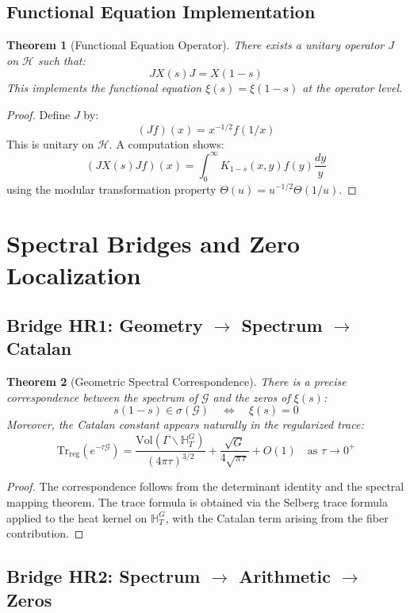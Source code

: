 \documentclass[11pt]{article}
\theoremstyle{plain}
\newtheorem{theorem}{Theorem}[section]
\theoremstyle{remark}
\newcommand{\H}{\mathbb{H}}
\newcommand{\Vol}{\mathrm{Vol}}
\newcommand{\Tr}{\mathrm{Tr}}
\newcommand{\spec}{\sigma}
\newcommand{\cH}{\mathcal{H}}
\newcommand{\cG}{\mathcal{G}}
\newcommand{\Catalan}{G}
\begin{document}
\subsection{Functional Equation Implementation}

\begin{theorem}[Functional Equation Operator]
There exists a unitary operator $J$ on $\cH$ such that:
\[
J X(s) J = X(1-s)
\]
This implements the functional equation $\xi(s) = \xi(1-s)$ at the operator level.
\end{theorem}

\begin{proof}
Define $J$ by:
\[
(Jf)(x) = x^{-1/2} f(1/x)
\]
This is unitary on $\cH$. A computation shows:
\[
(J X(s) J f)(x) = \int_0^\infty K_{1-s}(x,y) f(y) \frac{dy}{y}
\]
using the modular transformation property $\Theta(u) = u^{-1/2} \Theta(1/u)$.
\end{proof}

\section{Spectral Bridges and Zero Localization}

\subsection{Bridge HR1: Geometry $\rightarrow$ Spectrum $\rightarrow$ Catalan}

\begin{theorem}[Geometric Spectral Correspondence]
There is a precise correspondence between the spectrum of $\cG$ and the zeros of $\xi(s)$:
\[
s(1-s) \in \spec(\cG) \quad \Longleftrightarrow \quad \xi(s) = 0
\]
Moreover, the Catalan constant appears naturally in the regularized trace:
\[
\Tr_{\text{reg}}(e^{-\tau\cG}) = \frac{\Vol(\Gamma \backslash \H_T^{\Catalan})}{(4\pi\tau)^{3/2}} + \frac{\sqrt{\Catalan}}{4\sqrt{\pi\tau}} + O(1) \quad \text{as } \tau \to 0^+
\]
\end{theorem}

\begin{proof}
The correspondence follows from the determinant identity and the spectral mapping theorem. The trace formula is obtained via the Selberg trace formula applied to the heat kernel on $\H_T^{\Catalan}$, with the Catalan term arising from the fiber contribution.
\end{proof}

\subsection{Bridge HR2: Spectrum $\rightarrow$ Arithmetic $\rightarrow$ Zeros}
\end{document}
